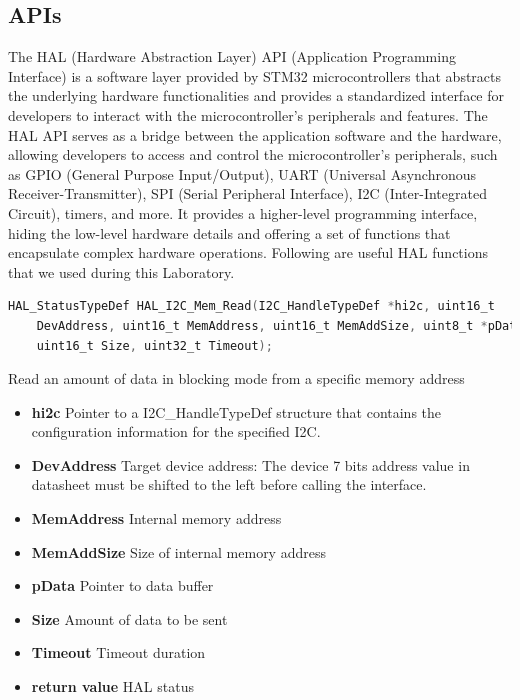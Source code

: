 \documentclass[english]{article}
\begin{document}
\subsection{APIs}
The HAL (Hardware Abstraction Layer) API (Application Programming Interface) 
is a software layer provided by STM32 microcontrollers that abstracts
 the underlying hardware functionalities and provides a standardized 
 interface for developers to interact with the microcontroller's peripherals and features.
The HAL API serves as a bridge between the application software and the hardware, 
allowing developers to access and control the microcontroller's peripherals,
such as GPIO (General Purpose Input/Output), UART (Universal Asynchronous Receiver-Transmitter),
SPI (Serial Peripheral Interface), I2C (Inter-Integrated Circuit), 
timers, and more. It provides a higher-level programming interface,
hiding the low-level hardware details and offering a set of functions that
encapsulate complex hardware operations. \newline
Following are useful HAL functions that we used during this Laboratory.
\begin{lstlisting}[language=C, caption={Reading Register values}, label={lst:read} ]
HAL_StatusTypeDef HAL_I2C_Mem_Read(I2C_HandleTypeDef *hi2c, uint16_t
    DevAddress, uint16_t MemAddress, uint16_t MemAddSize, uint8_t *pData,
    uint16_t Size, uint32_t Timeout);
\end{lstlisting}
Read an amount of data in blocking mode from a specific memory address  
\begin{itemize}
    \item \textbf{hi2c} Pointer to a I2C\_HandleTypeDef structure that contains the configuration information
    for the specified I2C.
    \item \textbf{DevAddress} Target device address: The device 7 bits address value in datasheet must be
    shifted to the left before calling the interface.
    \item \textbf{MemAddress} Internal memory address
    \item \textbf{MemAddSize} Size of internal memory address
    \item \textbf{pData} Pointer to data buffer
    \item \textbf{Size} Amount of data to be sent
    \item \textbf{Timeout} Timeout duration
    \item \textbf{return value} HAL status
\end{itemize}
\end{document}
